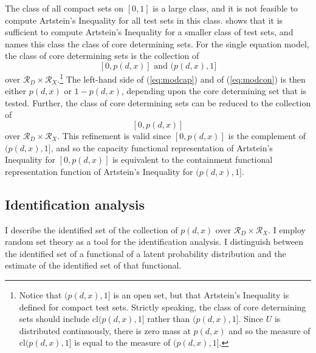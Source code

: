 \documentclass[12pt,a4paper,twoside]{article}
\numberwithin{equation}{section}
\newcommand{\Art}{Artstein's Inequality}
\begin{document}
The class of all compact sets on $[0,1]$ is a large class, and it is not feasible to compute {\Art} for all test sets in this class. \cite{crs13} shows that it is sufficient to compute {\Art} for a smaller class of test sets, and names this class the class of core determining sets. For the single equation model, the class of core determining sets is the collection of 
\[[0,p(d,x)]\text{ and }(p(d,x),1]\]
over $\mathcal{R}_D\times\mathcal{R}_X$.\footnote{Notice that $(p(d,x),1]$ is an open set, but that {\Art} is defined for compact test sets. Strictly speaking, the class of core determining sets should include $\text{cl}(p(d,x),1]$ rather than $(p(d,x),1]$. Since $U$ is distributed continuously, there is zero mass at $p(d,x)$ and so the measure of $\text{cl}(p(d,x),1]$ is equal to the measure of $(p(d,x),1]$.} The left-hand side of (\ref{eq:modcap}) and of (\ref{eq:modcon}) is then either $p(d,x)$ or $1-p(d,x)$, depending upon the core determining set that is tested. Further, the class of core determining sets can be reduced to the collection of
\[[0,p(d,x)]\]
over $\mathcal{R}_D\times\mathcal{R}_X$. This refinement is valid since $[0,p(d,x)]$ is the complement of $(p(d,x),1]$, and so the capacity functional representation of {\Art} for $[0,p(d,x)]$ is equivalent to the containment functional representation function of {\Art} for $(p(d,x),1]$.
\subsection{Identification analysis}
I describe the identified set of the collection of $p(d,x)$ over $\mathcal{R}_D\times\mathcal{R}_X$. I employ random set theory as a tool for the identification analysis. I distinguish between the identified set of a functional of a latent probability distribution and the estimate of the identified set of that functional.
\end{document}
